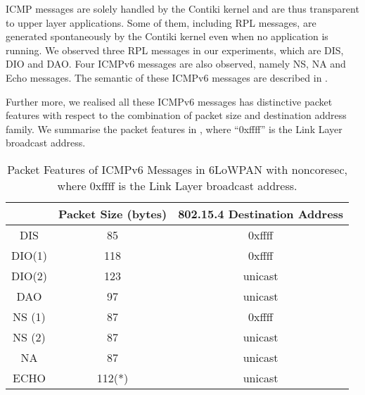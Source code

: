 ICMP messages are solely handled by the Contiki kernel and are thus transparent to  upper layer applications. Some of them, including RPL messages, are generated spontaneously by the Contiki kernel even when no application is running. We observed three RPL messages in our experiments, which are DIS, DIO and DAO. Four ICMPv6 messages are also observed, namely NS, NA and Echo messages. The semantic of these ICMPv6 messages are described in .

Further more, we realised all these ICMPv6 messages has distinctive packet features with respect to the combination of packet size and destination address family. We summarise the packet features in , where ``0xffff'' is the Link Layer broadcast address.

\begin{table}[ht!]
	\center
	\begin{tabular}{|c|c|c|}
		\hline
		       & Packet Size (bytes) & 802.15.4 Destination Address \\ \hline
		DIS    & 85                  & 0xffff                       \\ \hline
		DIO(1) & 118                 & 0xffff                       \\ \hline
		DIO(2) & 123                 & unicast                      \\ \hline
		DAO    & 97                  & unicast                      \\ \hline
		NS (1) & 87                  & 0xffff                       \\ \hline
		NS (2) & 87                  & unicast                      \\ \hline
		NA     & 87                  & unicast                      \\ \hline
		ECHO   & 112(*)               & unicast                      \\ \hline
	\end{tabular}
	\caption{Packet Features of ICMPv6 Messages in 6LoWPAN with noncoresec, where 0xffff is the Link Layer broadcast address.}
	\label{Tbl: Packet Features of ICMPv6 Messages in 6LoWPAN with noncoresec}
\end{table}


